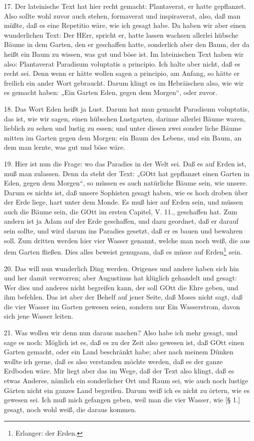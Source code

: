 17. Der lateinische Text hat hier recht gemacht: Plantaverat, er hatte gepflanzet. Also sollte wohl zuvor auch stehen, formaverat und inspiraverat, also, daß man müßte, daß es eine Repetitio wäre, wie ich gesagt habe. Da haben wir aber einen wunderlichen Text: Der HErr, spricht er, hatte lassen wachsen allerlei hübsche Bäume in dem Garten, den er geschaffen hatte, sonderlich aber den Baum, der da heißt ein Baum zu wissen, was gut und böse ist. Im lateinischen Text haben wir also: Plantaverat Paradisum voluptatis a principio. Ich halte aber nicht, daß es recht sei. Denn wenn er hätte wollen sagen a principio, am Anfang, so hätte er freilich ein ander Wort gebraucht. Darum klingt es im Hebräischen also, wie wir es gemacht haben: „Ein Garten Eden, gegen dem Morgen“, oder zuvor.

18. Das Wort Eden heißt ja Lust. Darum hat man gemacht Paradisum voluptatis, das ist, wie wir sagen, einen hübschen Lustgarten, darinne allerlei Bäume waren, lieblich zu sehen und lustig zu essen; und unter diesen zwei sonder
liche Bäume mitten im Garten gegen dem Morgen: ein Baum des Lebens, und ein Baum, an dem man lernte, was gut und böse wäre.

19. Hier ist nun die Frage: wo das Paradies in der Welt sei. Daß es auf Erden ist, muß man zulassen. Denn da steht der Text: „GOtt hat gepflanzet einen Garten in Eden, gegen dem Morgen“, so müssen es auch natürliche Bäume sein, wie unsere. Darum es nichts ist, daß unsere Sophisten gesagt haben, wie es hoch droben über der Erde liege, hart unter dem Monde. Es muß hier auf Erden sein, und müssen auch die Bäume sein, die GOtt im ersten Capitel, V. 11., geschaffen hat. Zum andern ist ja Adam auf der Erde geschaffen, und dazu geordnet, daß er darauf sein sollte, und wird darum ins Paradies gesetzt, daß er es bauen und bewahren soll. Zum dritten werden hier vier Wasser genannt, welche man noch weiß, die aus dem Garten fließen. Dies alles beweist genugsam, daß es müsse auf Erden\footnote{Erlanger: der Erden.} sein.

20. Das will nun wunderlich Ding werden. Origenes und andere haben sich hin und her damit verworren; aber Augustinus hat klüglich gehandelt und gesagt: Wer dies und anderes nicht begreifen kann, der soll GOtt die Ehre geben, und ihm befehlen. Das ist aber der Behelf auf jener Seite, daß Moses nicht sagt, daß die vier Wasser im Garten gewesen seien, sondern nur Ein Wasserstrom, davon sich jene Wasser leiten.

21. Was wollen wir denn nun daraus machen? Also habe ich mehr gesagt, und sage es noch: Möglich ist es, daß es zu der Zeit also gewesen ist, daß GOtt einen Garten gemacht, oder ein Land beschränkt habe; aber nach meinem Dünken wollte ich gerne, daß es also verstanden möchte werden, daß es der ganze Erdboden wäre. Mir liegt aber das im Wege, daß der Text also klingt, daß es etwas Anderes, nämlich ein sonderlicher Ort und Raum sei, wie auch noch lustige Gärten nicht ein ganzes Land begreifen. Darum weiß ich es nicht zu örtern, wie es gewesen sei. Ich muß mich gefangen geben, weil man die vier Wasser, wie [§ 1.] gesagt, noch wohl weiß, die daraus kommen.


